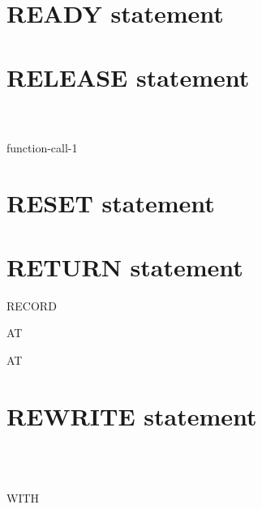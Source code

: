 \section{READY statement}


\section{RELEASE statement}

 \identifier
\begin{0-1}
  \begin{1=}
    \identifier \\
    \literal \\
    function-call-1
  \end{1=}
\end{0-1}

\section{RESET statement}


\section{RETURN statement}

 \filename RECORD
\begin{0-1}
   \identifier
\end{0-1}

AT  \imperativestatement

\begin{0-1}
   AT  \imperativestatement
\end{0-1}

\begin{0-1}
\end{0-1}

\section{REWRITE statement}

\recordname
\begin{0-1}
  \begin{1=}
    \identifier \\
    \literal \\
    \functionname
  \end{1=}
\end{0-1}
\begin{0-1}
  WITH
  \begin{0-1}
  \end{0-1}
\end{0-1}

